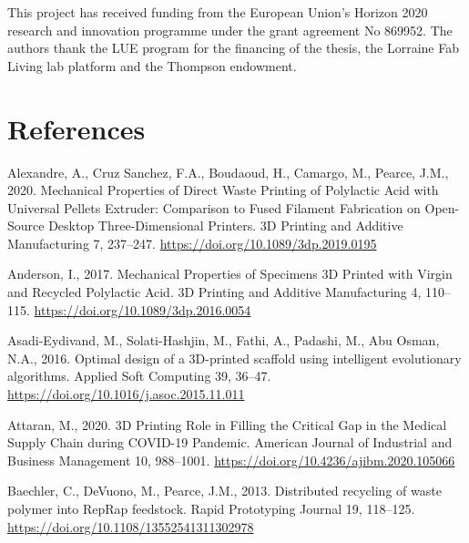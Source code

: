 \documentclass[
  12pt,
]{article}
\newlength{\cslhangindent}
\newlength{\cslentryspacingunit} %
\newenvironment{CSLReferences}[2] %
 {%
  \setlength{\parindent}{0pt}
  \ifodd #1
  \let\oldpar\par
  \def\par{\hangindent=\cslhangindent\oldpar}
  \fi
  \setlength{\parskip}{#2\cslentryspacingunit}
 }%
 {}
\begin{document}
This project has received funding from the European Union's Horizon 2020
research and innovation programme under the grant agreement No 869952.
The authors thank the LUE program for the financing of the thesis, the
Lorraine Fab Living lab platform and the Thompson endowment.

\newpage

\hypertarget{references}{%
\section*{References}\label{references}}


\hypertarget{refs}{}
\begin{CSLReferences}{1}{0}
\leavevmode{}%
Alexandre, A., Cruz Sanchez, F.A., Boudaoud, H., Camargo, M., Pearce,
J.M., 2020. Mechanical {Properties} of {Direct Waste Printing} of
{Polylactic Acid} with {Universal Pellets Extruder}: {Comparison} to
{Fused Filament Fabrication} on {Open-Source Desktop Three-Dimensional
Printers}. 3D Printing and Additive Manufacturing 7, 237--247.
\url{https://doi.org/10.1089/3dp.2019.0195}

\leavevmode{}%
Anderson, I., 2017. Mechanical {Properties} of {Specimens 3D Printed}
with {Virgin} and {Recycled Polylactic Acid}. 3D Printing and Additive
Manufacturing 4, 110--115. \url{https://doi.org/10.1089/3dp.2016.0054}

\leavevmode{}%
Asadi-Eydivand, M., Solati-Hashjin, M., Fathi, A., Padashi, M., Abu
Osman, N.A., 2016. Optimal design of a {3D-printed} scaffold using
intelligent evolutionary algorithms. Applied Soft Computing 39, 36--47.
\url{https://doi.org/10.1016/j.asoc.2015.11.011}

\leavevmode{}%
Attaran, M., 2020. {3D Printing Role} in {Filling} the {Critical Gap} in
the {Medical Supply Chain} during {COVID-19 Pandemic}. American Journal
of Industrial and Business Management 10, 988--1001.
\url{https://doi.org/10.4236/ajibm.2020.105066}

\leavevmode{}%
Baechler, C., DeVuono, M., Pearce, J.M., 2013. Distributed recycling of
waste polymer into {RepRap} feedstock. Rapid Prototyping Journal 19,
118--125. \url{https://doi.org/10.1108/13552541311302978}


\end{CSLReferences}
\end{document}
